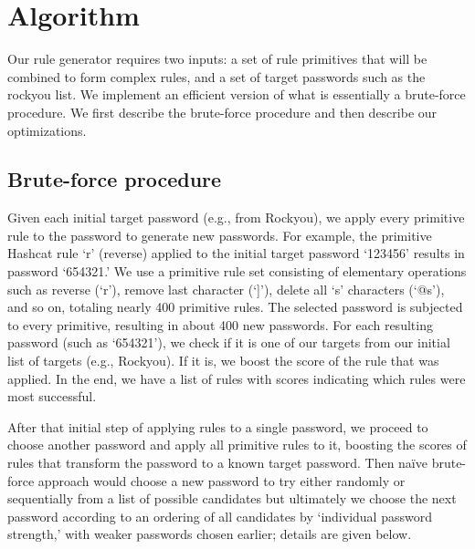 \documentclass[letterpaper,twocolumn,10pt]{article}
\begin{document}
\section{Algorithm}
\label{sec:algorithm}

Our rule generator requires two inputs: a set of rule primitives that will be
combined to form complex rules, and a set of target passwords such as the
rockyou list. We implement an efficient version of what is essentially a
brute-force procedure. We first describe the brute-force procedure and then
describe our optimizations.


\subsection{Brute-force procedure}

Given each initial target password (e.g., from Rockyou), we apply every
primitive rule to the password to generate new passwords. For example, the
primitive Hashcat rule `r' (reverse) applied to the initial target password
`123456' results in password `654321.' We use a primitive rule set consisting
of elementary operations such as reverse (`r'), remove last character (`]'),
delete all `s' characters (`@s'), and so on, totaling nearly 400 primitive
rules. The selected password is subjected to every primitive, resulting in about
400 new passwords. For each resulting password (such as `654321'), we check if
it is one of our targets from our initial list of targets (e.g., Rockyou). If it
is, we boost the score of the rule that was applied. In the end, we have a list
of rules with scores indicating which rules were most successful.

After that initial step of applying rules to a single password, we proceed to
choose another password and apply all primitive rules to it, boosting the
scores of rules that transform the password to a known target password. Then
naïve brute-force approach would choose a new password to try either randomly
or sequentially from a list of possible candidates but ultimately we
choose the next password according to an ordering of all candidates by
`individual password strength,' with weaker passwords chosen earlier; details
are given below.
\end{document}
